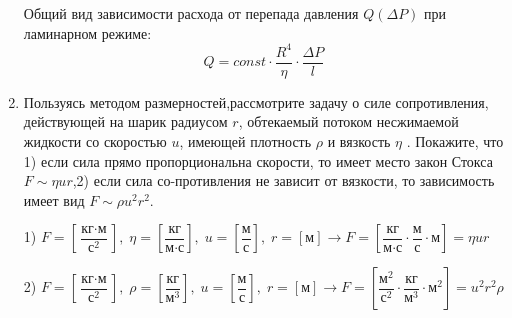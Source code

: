\documentclass[a4paper,12pt]{article}
\begin{document}
\begin{enumerate}
    Общий вид зависимости расхода от перепада давления $Q(\Delta P)$ при ламинарном режиме: $$Q = const \cdot \frac{R^{4}}{\eta} \cdot \frac{\Delta P}{l}$$
\item Пользуясь методом размерностей,рассмотрите задачу о силе сопротивления, действующей на шарик радиусом $r$, обтекаемый потоком несжимаемой жидкости со скоростью $u$, имеющей плотность $\rho$ и вязкость $\eta$ . Покажите, что 1) если сила прямо пропорциональна скорости, то имеет место закон Стокса $F \sim \eta u r $,2) если сила со-противления не зависит от вязкости, то зависимость имеет вид $F \sim \rho u^2 r^2 $. 

1) $F = \left[ \dfrac{\text{кг} \cdot \text{м}}{\text{с} ^ 2} \right], \; \eta = \left[ \dfrac{\text{кг}}{\text{м} \cdot \text{с}} \right], \; u = \left[ \dfrac{\text{м}}{\text{с}} \right], \; r = [\text{м}] \rightarrow F = \left[ \dfrac{\text{кг}}{\text{м} \cdot \text{с}} \cdot \dfrac{\text{м}}{\text{с}} \cdot \text{м} \right] = \eta u r $ 

2) $F = \left[ \dfrac{\text{кг} \cdot \text{м}}{\text{с} ^ 2} \right], \; \rho = \left[ \dfrac{\text{кг}}{\text{м} ^ 3} \right], \; u = \left[ \dfrac{\text{м}}{\text{с}} \right], \; r = [\text{м}] \rightarrow F = \left[ \dfrac{\text{м} ^ 2}{\text{с} ^ 2} \cdot \dfrac{\text{кг}}{\text{м} ^ 3} \cdot \text{м} ^ 2 \right] = u^2 r^2 \rho $

\end{enumerate}
\end{document}
